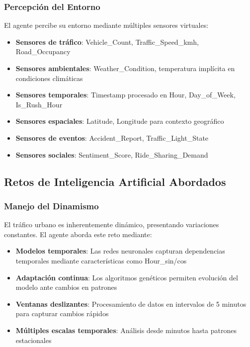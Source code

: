 \documentclass{svproc} %
\begin{document}
\subsubsection{Percepción del Entorno}
El agente percibe su entorno mediante múltiples sensores virtuales:
\begin{itemize}
    \item \textbf{Sensores de tráfico}: Vehicle\_Count, Traffic\_Speed\_kmh, Road\_Occupancy\\%
    \item \textbf{Sensores ambientales}: Weather\_Condition, temperatura implícita en condiciones climáticas
    \item \textbf{Sensores temporales}: Timestamp procesado en Hour, Day\_of\_Week, Is\_Rush\_Hour
    \item \textbf{Sensores espaciales}: Latitude, Longitude para contexto geográfico
    \item \textbf{Sensores de eventos}: Accident\_Report, Traffic\_Light\_State
    \item \textbf{Sensores sociales}: Sentiment\_Score, Ride\_Sharing\_Demand
\end{itemize}

\subsection{Retos de Inteligencia Artificial Abordados}

\subsubsection{Manejo del Dinamismo}

El tráfico urbano es inherentemente dinámico, presentando variaciones constantes. El agente aborda este reto mediante:

\begin{itemize}
    \item \textbf{Modelos temporales}: Las redes neuronales capturan dependencias temporales mediante características como Hour\_sin/cos
    \item \textbf{Adaptación continua}: Los algoritmos genéticos permiten evolución del modelo ante cambios en patrones
    \item \textbf{Ventanas deslizantes}: Procesamiento de datos en intervalos de 5 minutos para capturar cambios rápidos
    \item \textbf{Múltiples escalas temporales}: Análisis desde minutos hasta patrones estacionales
\end{itemize}
\end{document}
